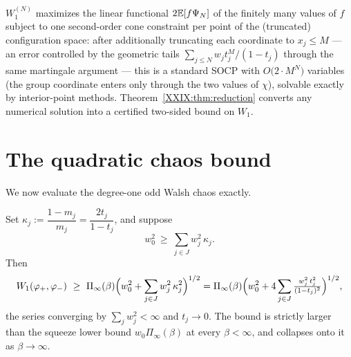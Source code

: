 \begin{remark}\label{XXIX:rem:socp}
$W_1^{(N)}$ maximizes the linear functional $2\mathbb{E}[f\Psi_N]$ of the finitely many values of
$f$ subject to one second-order cone constraint per point of the (truncated) configuration
space: after additionally truncating each coordinate to $x_j\le M$ --- an error controlled
by the geometric tails $\sum_{j\le N}w_jt_j^{M}/(1-t_j)$ through the same martingale
argument --- this is a standard SOCP with $O\bigl(2\cdot M^N\bigr)$ variables (the group
coordinate enters only through the two values of $\chi$), solvable exactly by interior-point
methods. Theorem~\ref{XXIX:thm:reduction} converts any numerical solution into a certified
two-sided bound on $W_1$.
\end{remark}

\section{The quadratic chaos bound}\label{XXIX:sec:quadratic}

We now evaluate the degree-one odd Walsh chaos exactly.

\begin{theorem}\label{XXIX:thm:quadratic}
Set $\kappa_j:=\dfrac{1-m_j}{m_j}=\dfrac{2t_j}{1-t_j}$, and suppose
\begin{equation}\label{XXIX:eq:interior}
w_0^2\ \ge\ \sum_{j\in J}w_j^2\,\kappa_j .
\end{equation}
Then
\[
W_1(\varphi_+,\varphi_-)\ \ge\
\Pi_\infty(\beta)\Bigl(w_0^2+\sum_{j\in J}w_j^2\,\kappa_j^2\Bigr)^{1/2}
=\Pi_\infty(\beta)\Bigl(w_0^2+4\sum_{j\in J}\tfrac{w_j^2\,t_j^2}{(1-t_j)^2}\Bigr)^{1/2},
\]
the series converging by $\sum_jw_j^2<\infty$ and $t_j\to0$. The bound is strictly larger
than the squeeze lower bound $w_0\Pi_\infty(\beta)$ at every $\beta<\infty$, and collapses
onto it as $\beta\to\infty$.
\end{theorem}

